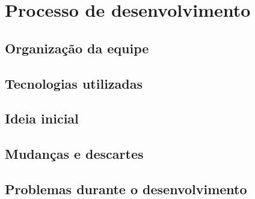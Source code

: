 \chapter{Processo de desenvolvimento}

\section{Organização da equipe}

\section{Tecnologias utilizadas}

\section{Ideia inicial}

\section{Mudanças e descartes}

\section{Problemas durante o desenvolvimento}

